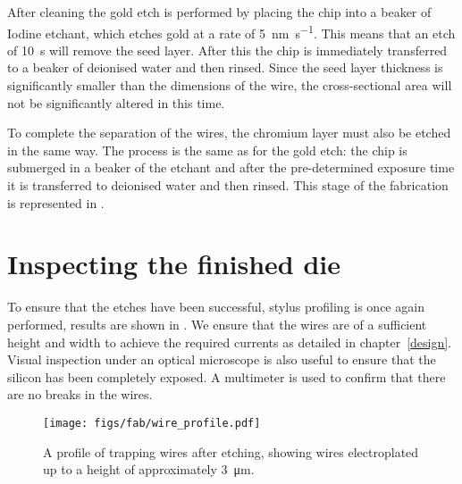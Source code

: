 \begin{figure}
\centering
  \caption{}
  \label{fab:fig:etchres}
\end{figure}

%
After cleaning the gold etch is performed by placing the chip into a beaker of
Iodine etchant, which etches gold at a rate of \SI{5}{\nano\meter\per\second}.
This means that an etch of \SI{10}{\second} will remove the seed layer. After
this the chip is immediately transferred to a beaker of deionised water and
then rinsed. Since the seed layer thickness is significantly smaller than the
dimensions of the wire, the cross-sectional area will not be significantly
altered in this time.

%
To complete the separation of the wires, the chromium layer must also be etched
in the same way. The process is the same as for the gold etch: the chip is
submerged in a beaker of the etchant and after the pre-determined exposure time
it is transferred to deionised water and then rinsed. This stage of the
fabrication is represented in . 

\section{Inspecting the finished die}

To ensure that the etches have been successful, stylus profiling is once again
performed, results are shown in . We ensure that
the wires are of a sufficient height and width to achieve the required currents
as detailed in chapter~\ref{design}. Visual inspection under an optical
microscope is also useful to ensure that the silicon has been completely
exposed. A multimeter is used to confirm that there are no breaks in the wires.

\begin{figure}
\centering
  \texttt{[image: figs/fab/wire\_profile.pdf]}
  \caption{A profile of trapping wires after etching, showing wires
  electroplated up to a height of approximately \SI{3}{\micro\meter}.
  }
  \label{fab:fig:endprofile}
\end{figure}

